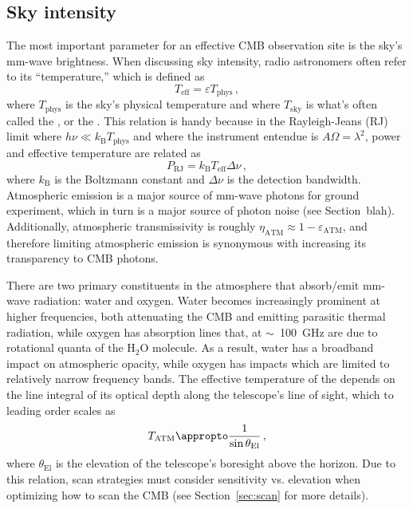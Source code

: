 
\subsection{Sky intensity}
\label{sec:sky_intensity}

The most important parameter for an effective CMB observation site is the sky's mm-wave brightness. When discussing sky intensity, radio astronomers often refer to its ``temperature,'' which is defined as
\begin{equation}
    T_{\mathrm{eff}} = \varepsilon T_{\mathrm{phys}} \, ,
    \label{eq:sky_temperature}
\end{equation}
where $T_{\mathrm{phys}}$ is the sky's physical temperature and where $T_{\mathrm{sky}}$ is what's often called the , or the . This relation is handy because in the Rayleigh-Jeans (RJ) limit where $h \nu \ll k_{\mathrm{B}} T_{\mathrm{phys}}$ and where the instrument entendue is $A \Omega = \lambda^{2}$, power and effective temperature are related as
\begin{equation}
    P_{\mathrm{RJ}} = k_{\mathrm{B}} T_{\mathrm{eff}} \Delta \nu \, ,
    \label{eq:RJ_power}
\end{equation}
where $k_{\mathrm{B}}$ is the Boltzmann constant and $\Delta \nu$ is the detection bandwidth. Atmospheric emission is a major source of mm-wave photons for ground experiment, which in turn is a major source of photon noise (see Section~blah). Additionally, atmospheric transmissivity is roughly $\eta_{\mathrm{ATM}} \approx 1 - \varepsilon_{\mathrm{ATM}}$, and therefore limiting atmospheric emission is synonymous with increasing its transparency to CMB photons. 

There are two primary constituents in the atmosphere that absorb/emit mm-wave radiation: water and oxygen. Water becomes increasingly prominent at higher frequencies, both attenuating the CMB and emitting parasitic thermal radiation, while oxygen has absorption lines that, at $\sim$~100~GHz are due to rotational quanta of the $\mathrm{H_{2}O}$ molecule. As a result, water has a broadband impact on atmospheric opacity, while oxygen has impacts which are limited to relatively narrow frequency bands. The effective temperature of the depends on the line integral of its optical depth along the telescope's line of sight, which to leading order scales as
\begin{equation}
    T_{\mathrm{ATM}} \appropto \frac{1}{\sin \theta_{\mathrm{El}}} \, ,
    \label{eq:atmospheric_brightness_elevation_dependence}
\end{equation}
where $\theta_{\mathrm{El}}$ is the elevation of the telescope's boresight above the horizon. Due to this relation, scan strategies must consider sensitivity vs. elevation when optimizing how to scan the CMB (see Section~\ref{sec:scan} for more details).

